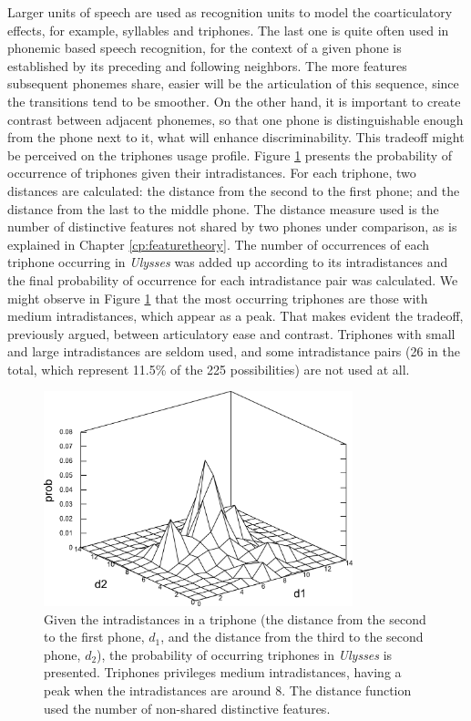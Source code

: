Larger units of speech are used as recognition units to model the coarticulatory effects,
for example, syllables and triphones. The last one is quite often used in phonemic based
speech recognition, for the context of a given phone is established by its preceding and
following neighbors. 
The more features subsequent phonemes share, easier will be the articulation of this 
sequence, since the transitions tend to be smoother. On the other hand, it is important 
to create contrast between adjacent phonemes, so that one phone is distinguishable
enough from the phone next to it, what will enhance discriminability. This tradeoff
might be perceived on the triphones usage profile. 
Figure \ref{fig:ulysses_triphones_intradistances_mesh} presents the probability of occurrence of
triphones given their intradistances. For each triphone, two distances are calculated: the
distance from the second to the first phone; and the distance from the last to the middle phone.
The distance measure used is the number of distinctive features not shared by two phones under comparison,
as is explained in Chapter \ref{cp:featuretheory}. The number of occurrences of each triphone occurring in 
\textit{Ulysses} was added up 
according to its intradistances and the final probability of occurrence for each intradistance pair 
was calculated. We might observe in Figure \ref{fig:ulysses_triphones_intradistances_mesh}
that the most occurring triphones are those with medium intradistances, which appear as
a peak. That makes evident the tradeoff, previously argued, between articulatory ease and contrast.  
Triphones with small and large intradistances are seldom used, and some intradistance pairs
(26 in the total, which represent 11.5\% of the 225 possibilities) are not used at all.


\begin{figure}[h]
\centering  
\includegraphics[width=0.8\textwidth]{images/ulysses_triphones_intradistances_mesh.pdf}  
\caption{Given the intradistances in a triphone (the distance from the second to the first phone, $d_1$, and the distance from the third to the second phone, $d_2$), the probability of occurring triphones in \textit{Ulysses} is presented. Triphones privileges medium intradistances, having a peak when the intradistances are around 8. The distance function used the number of non-shared distinctive features.}
\label{fig:ulysses_triphones_intradistances_mesh}  
\end{figure} 


